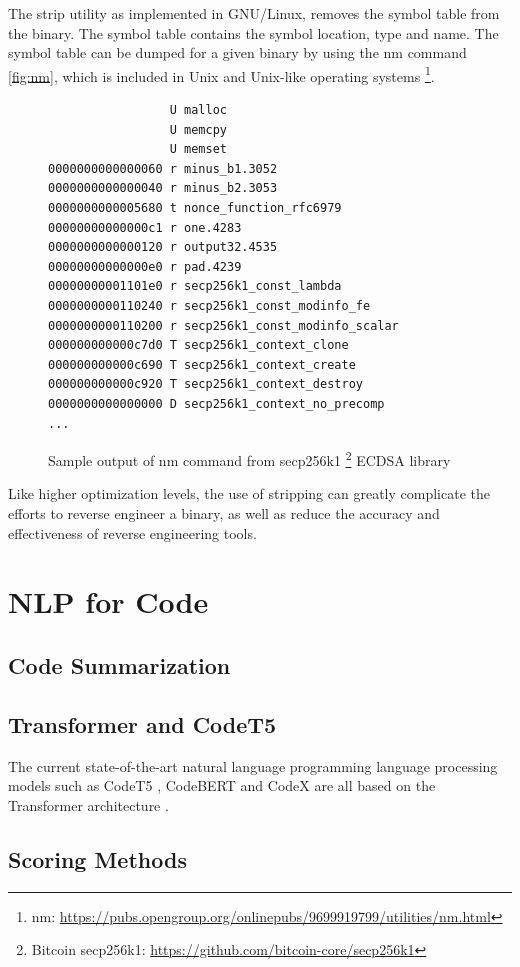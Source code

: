 The strip utility as implemented in GNU/Linux, removes the symbol table from the binary. The symbol table contains the symbol location, type and name. The symbol table can be dumped for a given binary by using the nm command \ref{fig:nm}, which is included in Unix and Unix-like operating systems \footnote{nm: \url{https://pubs.opengroup.org/onlinepubs/9699919799/utilities/nm.html}}. 

\label{fig:nm}
\begin{figure}[!h]
  \centering
\begin{lstlisting}
                 U malloc
                 U memcpy
                 U memset
0000000000000060 r minus_b1.3052
0000000000000040 r minus_b2.3053
0000000000005680 t nonce_function_rfc6979
00000000000000c1 r one.4283
0000000000000120 r output32.4535
00000000000000e0 r pad.4239
00000000001101e0 r secp256k1_const_lambda
0000000000110240 r secp256k1_const_modinfo_fe
0000000000110200 r secp256k1_const_modinfo_scalar
000000000000c7d0 T secp256k1_context_clone
000000000000c690 T secp256k1_context_create
000000000000c920 T secp256k1_context_destroy
0000000000000000 D secp256k1_context_no_precomp
...
\end{lstlisting}
  \caption{Sample output of nm command from secp256k1 \protect\footnote{Bitcoin secp256k1: \protect\url{https://github.com/bitcoin-core/secp256k1}} ECDSA library}
\end{figure}

Like higher optimization levels, the use of stripping can greatly complicate the efforts to reverse engineer a binary, as well as reduce the accuracy and effectiveness of reverse engineering tools. 
\section{NLP for Code}

\subsection{Code Summarization}

\subsection{Transformer and CodeT5}
The current state-of-the-art natural language programming language processing models such as CodeT5 \cite{CodeT5}, CodeBERT \cite{CodeBERT} and CodeX \cite{CodeX} are all based on the Transformer architecture \cite{Transformers}.

\subsection{Scoring Methods}